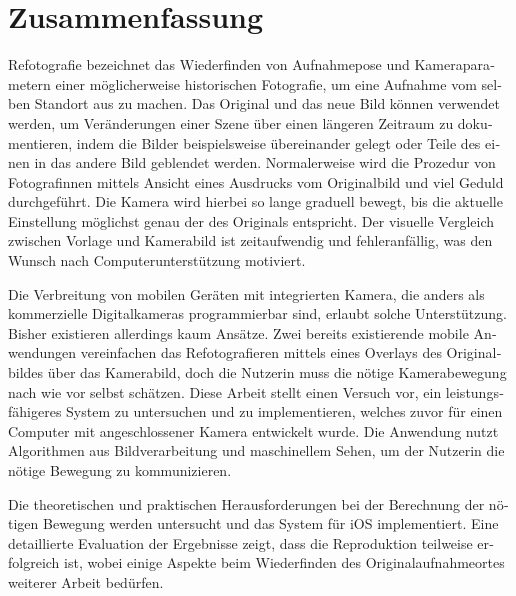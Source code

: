\chapter*{Zusammenfassung}

\begin{otherlanguage}{german}

   Refotografie bezeichnet das Wiederfinden von Aufnahmepose und Kameraparametern
   einer möglicherweise historischen Fotografie, um eine Aufnahme vom selben
   Standort aus zu machen.  Das Original und das neue Bild
   können verwendet werden, um Veränderungen einer Szene über einen längeren
   Zeitraum zu dokumentieren, indem die Bilder beispielsweise übereinander gelegt
   oder Teile des einen in das andere Bild geblendet werden. Normalerweise wird die
   Prozedur von Fotografinnen mittels Ansicht eines Ausdrucks vom Originalbild und
   viel Geduld durchgeführt. Die Kamera wird hierbei so lange graduell bewegt, bis
   die aktuelle Einstellung möglichst genau der des Originals entspricht. Der
   visuelle Vergleich zwischen Vorlage und Kamerabild ist zeitaufwendig und
   fehleranfällig, was den Wunsch nach Computerunterstützung motiviert.

   Die Verbreitung von mobilen Geräten mit integrierten Kamera, die anders als
   kommerzielle Digitalkameras programmierbar sind, erlaubt solche
   Unterstützung.  Bisher existieren allerdings kaum Ansätze. Zwei bereits
   existierende mobile Anwendungen vereinfachen das Refotografieren mittels
   eines Overlays des Originalbildes über das Kamerabild, doch die Nutzerin muss
   die nötige Kamerabewegung nach wie vor selbst schätzen. Diese Arbeit stellt
   einen Versuch vor, ein leistungsfähigeres System zu untersuchen und zu
   implementieren, welches zuvor für einen Computer mit angeschlossener Kamera
   entwickelt wurde. Die Anwendung nutzt Algorithmen aus Bildverarbeitung und
   maschinellem Sehen, um der Nutzerin die nötige Bewegung zu kommunizieren.

   Die theoretischen und praktischen Herausforderungen bei der Berechnung der
   nötigen Bewegung werden untersucht und das System für iOS implementiert. Eine
   detaillierte Evaluation der Ergebnisse zeigt, dass die Reproduktion teilweise
   erfolgreich ist, wobei einige Aspekte beim Wiederfinden des
   Originalaufnahmeortes weiterer Arbeit bedürfen.

\end{otherlanguage}
